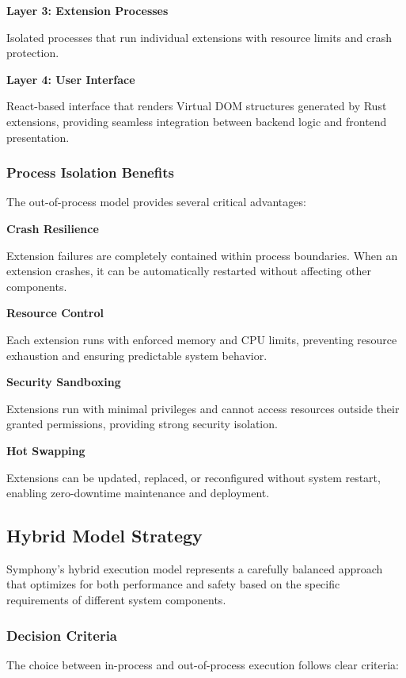 \textbf{Layer 3: Extension Processes}

Isolated processes that run individual extensions with resource limits and crash protection.

\textbf{Layer 4: User Interface}

React-based interface that renders Virtual DOM structures generated by Rust extensions, providing seamless integration between backend logic and frontend presentation.

\subsubsection{Process Isolation Benefits}

The out-of-process model provides several critical advantages:

\textbf{Crash Resilience}

Extension failures are completely contained within process boundaries. When an extension crashes, it can be automatically restarted without affecting other components.

\textbf{Resource Control}

Each extension runs with enforced memory and CPU limits, preventing resource exhaustion and ensuring predictable system behavior.

\textbf{Security Sandboxing}

Extensions run with minimal privileges and cannot access resources outside their granted permissions, providing strong security isolation.

\textbf{Hot Swapping}

Extensions can be updated, replaced, or reconfigured without system restart, enabling zero-downtime maintenance and deployment.

\subsection{Hybrid Model Strategy}
\label{subsec:hybrid-model-strategy}

Symphony's hybrid execution model represents a carefully balanced approach that optimizes for both performance and safety based on the specific requirements of different system components.

\subsubsection{Decision Criteria}

The choice between in-process and out-of-process execution follows clear criteria:

